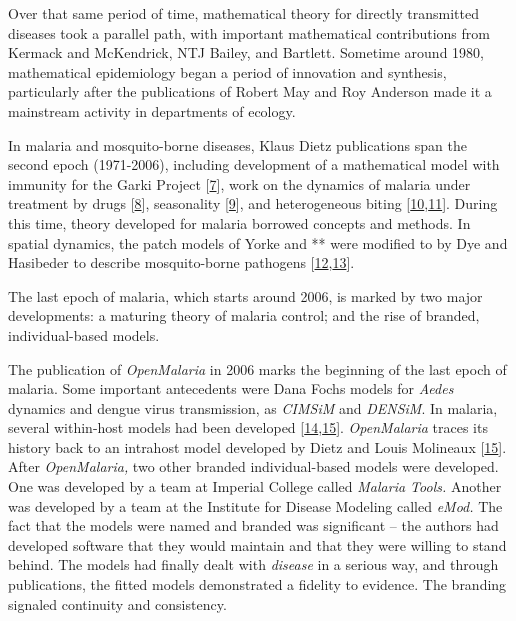 \documentclass[
]{book}
\begin{document}
Over that same period of time, mathematical theory for directly transmitted diseases took a parallel path, with important mathematical contributions from Kermack and McKendrick, NTJ Bailey, and Bartlett. Sometime around 1980, mathematical epidemiology began a period of innovation and synthesis, particularly after the publications of Robert May and Roy Anderson made it a mainstream activity in departments of ecology.

In malaria and mosquito-borne diseases, Klaus Dietz publications span the second epoch (1971-2006), including development of a mathematical model with immunity for the Garki Project {[}\protect\hyperlink{ref-DietzK1974MalariaModel}{7}{]}, work on the dynamics of malaria under treatment by drugs {[}\protect\hyperlink{ref-DietzK1975ModelsParasitic}{8}{]}, seasonality {[}\protect\hyperlink{ref-DietzK1976IncidenceInfectious}{9}{]}, and heterogeneous biting {[}\protect\hyperlink{ref-DietzK1980ModelsVectorborne}{10},\protect\hyperlink{ref-DietzK1988EpidemiologicalModels}{11}{]}. During this time, theory developed for malaria borrowed concepts and methods. In spatial dynamics, the patch models of Yorke and ** were modified to by Dye and Hasibeder to describe mosquito-borne pathogens {[}\protect\hyperlink{ref-DyeC1986PopulationDynamics}{12},\protect\hyperlink{ref-HasibederG1988PopulationDynamics}{13}{]}.

The last epoch of malaria, which starts around 2006, is marked by two major developments: a maturing theory of malaria control; and the rise of branded, individual-based models.

The publication of \emph{OpenMalaria} in 2006 marks the beginning of the last epoch of malaria. Some important antecedents were Dana Fochs models for \emph{Aedes} dynamics and dengue virus transmission, as \emph{CIMSiM} and \emph{DENSiM}. In malaria, several within-host models had been developed {[}\protect\hyperlink{ref-MolineauxL1999ReviewIntrahost}{14},\protect\hyperlink{ref-MolineauxL2001PlasmodiumFalciparum}{15}{]}. \emph{OpenMalaria} traces its history back to an intrahost model developed by Dietz and Louis Molineaux {[}\protect\hyperlink{ref-MolineauxL2001PlasmodiumFalciparum}{15}{]}. After \emph{OpenMalaria,} two other branded individual-based models were developed. One was developed by a team at Imperial College called \emph{Malaria Tools.} Another was developed by a team at the Institute for Disease Modeling called \emph{eMod.} The fact that the models were named and branded was significant -- the authors had developed software that they would maintain and that they were willing to stand behind. The models had finally dealt with \emph{disease} in a serious way, and through publications, the fitted models demonstrated a fidelity to evidence. The branding signaled continuity and consistency.
\end{document}
